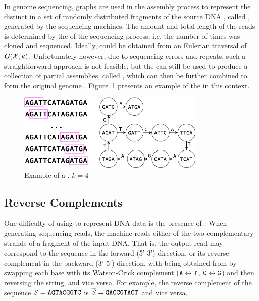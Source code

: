 In genome sequencing, \dB graphs are used in the assembly process to represent the distinct  in a set \readset of randomly distributed fragments of the source DNA , called , generated by the sequencing machines. The amount and total length of the reads is determined by the  of the sequencing process, i.e. the number of times  was cloned and sequenced. Ideally,  could be obtained from an Eulerian traversal of $G(\readset, k)$. Unfortunately however, due to sequencing errors and repeats, such a straightforward approach is not feasible, but the \dBG can still be used to produce a collection of partial assemblies, called , which can then be further combined to form the original genome \cite{Pevzner2001}. Figure~\ref{fig:dbgexample} presents an example of the \dBG in this context.

\begin{figure}[htbp]
	\begin{center}
    \includegraphics[width=0.8\textwidth]{figures/dbg-example}
	\end{center}
	\caption{Example of a \dBG. $k=4$}\label{fig:dbgexample}
\end{figure}

\subsection{Reverse Complements}
\label{subsec:dBG-reversecomplements}

One difficulty of using  to represent DNA data is the presence of . When generating sequencing reads, the machine reads either of the two complementary strands of a fragment of the input DNA. That is, the output read may correspond to the sequence  in the forward (5'-3') direction, or its reverse complement  in the backward (3'-5') direction, with
 being obtained from  by swapping each base with its Watson-Crick complement
($\mathtt{A} \leftrightarrow \mathtt{T}$, $\mathtt{C} \leftrightarrow \mathtt{G}$) and then reversing the string, and vice versa. For example, the reverse complement of the sequence $S=\mathtt{AGTACGGTC}$ is $\overline{S}=\mathtt{GACCGTACT}$ and vice versa.

